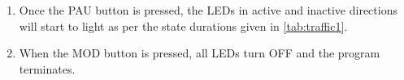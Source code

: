 \begin{enumerate}
\item Once the PAU button is pressed, the LEDs in active and inactive directions
  will start to light as per the state durations given in \autoref{tab:traffic1}.
\item When the MOD button is pressed, all LEDs turn OFF and the program terminates.
\end{enumerate}

 

